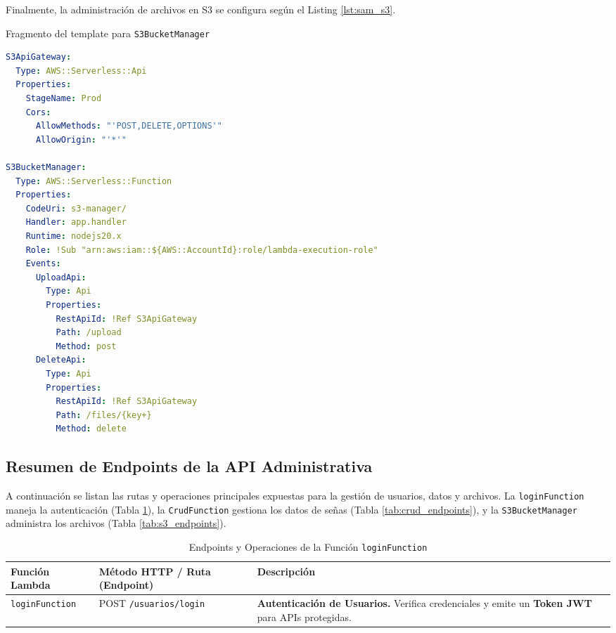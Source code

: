 Finalmente, la administración de archivos en S3 se configura según el Listing \ref{lst:sam_s3}.

\begin{codebox}{Fragmento del template para \texttt{S3BucketManager}}
    \begin{lstlisting}[language=yaml, caption={Fragmento del template para S3BucketManager}, label={lst:sam_s3}]
S3ApiGateway:
  Type: AWS::Serverless::Api
  Properties:
    StageName: Prod
    Cors:
      AllowMethods: "'POST,DELETE,OPTIONS'"
      AllowOrigin: "'*'"

S3BucketManager:
  Type: AWS::Serverless::Function
  Properties:
    CodeUri: s3-manager/
    Handler: app.handler
    Runtime: nodejs20.x
    Role: !Sub "arn:aws:iam::${AWS::AccountId}:role/lambda-execution-role"
    Events:
      UploadApi:
        Type: Api
        Properties:
          RestApiId: !Ref S3ApiGateway
          Path: /upload
          Method: post
      DeleteApi:
        Type: Api
        Properties:
          RestApiId: !Ref S3ApiGateway
          Path: /files/{key+}
          Method: delete
    \end{lstlisting}
\end{codebox}

\subsection{Resumen de Endpoints de la API Administrativa}
A continuación se listan las rutas y operaciones principales expuestas para la gestión de usuarios, datos y archivos. La \texttt{loginFunction} maneja la autenticación (Tabla \ref{tab:logging_endpoints}), la \texttt{CrudFunction} gestiona los datos de señas (Tabla \ref{tab:crud_endpoints}), y la \texttt{S3BucketManager} administra los archivos (Tabla \ref{tab:s3_endpoints}).

\begin{table}[H]
    \centering
    \caption{Endpoints y Operaciones de la Función \texttt{loginFunction}}
    \renewcommand{\arraystretch}{1.3}
    \begin{tabularx}{\textwidth}{|p{4cm}|p{5cm}|X|}
        \hline
        \textbf{Función Lambda} & \textbf{Método HTTP / Ruta (Endpoint)} & \textbf{Descripción} \\ \hline
        \texttt{loginFunction} & POST \texttt{/usuarios/login} & \textbf{Autenticación de Usuarios.} Verifica credenciales y emite un \textbf{Token JWT} para APIs protegidas. \\ \hline
    \end{tabularx}
    \label{tab:logging_endpoints}
\end{table}

